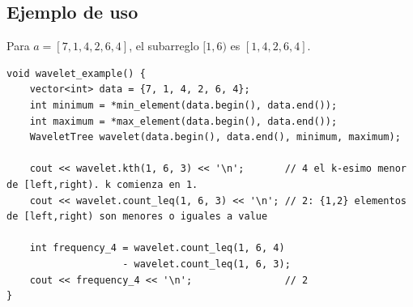 \subsection{Ejemplo de uso}

Para $a=[7,1,4,2,6,4]$, el subarreglo $[1,6)$ es $[1,4,2,6,4]$.

\begin{lstlisting}[style=cpp]
void wavelet_example() {
    vector<int> data = {7, 1, 4, 2, 6, 4};
    int minimum = *min_element(data.begin(), data.end());
    int maximum = *max_element(data.begin(), data.end());
    WaveletTree wavelet(data.begin(), data.end(), minimum, maximum);

    cout << wavelet.kth(1, 6, 3) << '\n';       // 4 el k-esimo menor de [left,right). k comienza en 1.
    cout << wavelet.count_leq(1, 6, 3) << '\n'; // 2: {1,2} elementos de [left,right) son menores o iguales a value

    int frequency_4 = wavelet.count_leq(1, 6, 4)
                    - wavelet.count_leq(1, 6, 3);
    cout << frequency_4 << '\n';                // 2
}
\end{lstlisting}

